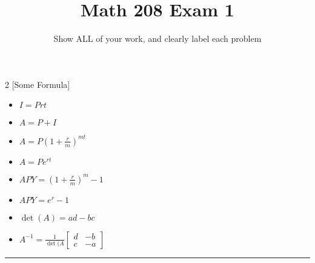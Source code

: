 \documentclass[12pt]{article}
\title{\vspace{-10ex}Math 208 Exam 1}
\author{}
\date{\vspace{-5ex}Show ALL of your work, and clearly label each problem}
\begin{document}
\maketitle
\begin{multicols}{2}
[Some Formula]
\begin{itemize}
	\item $I=Prt$
	\item $A=P+ I$
	\item $A = P(1+ \frac{r}{m})^{mt}$
	\item $A = Pe^{rt}$
	\item $APY = (1 + \frac{r}{m})^m -1$
	\item $APY = e^r -1$
	\item $\det(A) = ad-bc$
	\item $A^{-1} = \frac{1}{\det(A}\begin{bmatrix}
		d & -b \\
		c & -a
	\end{bmatrix}$
\end{itemize}
\end{multicols}

\begin{center}\rule{4cm}{0.4pt}\end{center}
\end{document}

